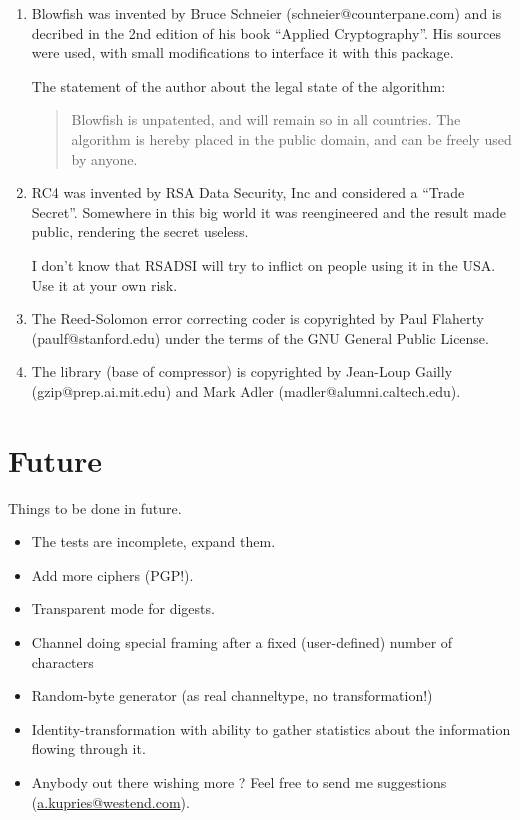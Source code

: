 \begin {enumerate}
\item	Blowfish was invented by Bruce Schneier
	(schneier@counterpane.com) and is decribed in the 2nd edition
	of his book ``Applied Cryptography''. His sources were used,
	with small modifications to interface it with this package.

	The statement of the author about the legal state of the
	algorithm:

	\begin {quotation}
		Blowfish is unpatented, and will remain so in all
		countries. The algorithm is hereby placed in the
		public domain, and can be freely used by anyone.
	\end {quotation}

\item	RC4 was invented by RSA Data Security, Inc and considered a
	``Trade Secret''. Somewhere in this big world it was
	reengineered and the result made public, rendering the secret
	useless.

	I don't know that RSADSI will try to inflict on people using it
	in the USA. Use it at your own risk.

\item	The Reed-Solomon error correcting coder is copyrighted by Paul
	Flaherty (paulf@stanford.edu) under the terms of the GNU
	General Public License.

\item	The library  (base of compressor) is copyrighted by
	Jean-Loup Gailly (gzip@prep.ai.mit.edu) and Mark Adler
	(madler@alumni.caltech.edu).

\end   {enumerate}


\chapter {Future}

Things to be done in future.

\begin {itemize}
\item	The tests are incomplete, expand them.
\item	Add more ciphers (PGP!).
\item	Transparent mode for digests.
\item	Channel doing special framing after a fixed (user-defined)
	number of characters
\item	Random-byte generator (as real channeltype, no transformation!)
\item	Identity-transformation with ability to gather statistics
	about the information flowing through it.
\item	Anybody out there wishing more ? Feel free to send me
	suggestions (\url {a.kupries@westend.com}).
\end   {itemize}


